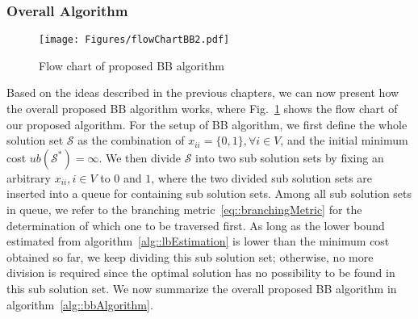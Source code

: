 \subsubsection{Overall Algorithm}
\begin{figure}
\begin{center}
\texttt{[image: Figures/flowChartBB2.pdf]}
\caption{\label{fig::flowChartBB}Flow chart of proposed BB algorithm}
\end{center}
\end{figure}
Based on the ideas described in the previous chapters, we can now present how the overall proposed BB algorithm works, where Fig.~\ref{fig::flowChartBB} shows the flow chart of our proposed algorithm.
For the setup of BB algorithm, we first define the whole solution set $\mathcal{S}$ as the combination of $x_{ii} = \{0,1\}, \forall i \in V$, and the initial minimum cost $ub(\mathcal{S}^*) = \infty$.
We then divide $\mathcal{S}$ into two sub solution sets by fixing an arbitrary $x_{ii}, i \in V$ to $0$ and $1$, where the two divided sub solution sets are inserted into a queue for containing sub solution sets.
Among all sub solution sets in queue, we refer to the branching metric~\eqref{eq::branchingMetric} for the determination of which one to be traversed first.
As long as the lower bound estimated from algorithm~\ref{alg::lbEstimation} is lower than the minimum cost obtained so far, we keep dividing this sub solution set; otherwise, no more division is required since the optimal solution has no possibility to be found in this sub solution set.
We now summarize the overall proposed BB algorithm in algorithm~\ref{alg::bbAlgorithm}.
\IncMargin{1em}
